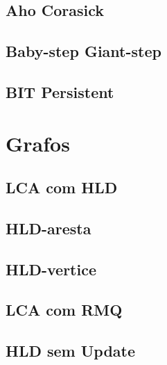 \documentclass[12pt, a4paper, twoside]{article}
\begin{document}
\subsection{Aho Corasick}


\subsection{Baby-step Giant-step}


\subsection{BIT Persistent}




%
%

\section{Grafos}

\subsection{LCA com HLD}


\subsection{HLD-aresta}


\subsection{HLD-vertice}


\subsection{LCA com RMQ}


\subsection{HLD sem Update}

\end{document}
